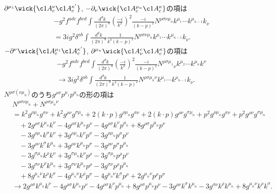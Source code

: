 $\partial^{\mu_1} \wick{\c1{A}^\nu_c \c1{A}_c^{\kappa'}}$, $-\partial_\nu \wick{\c1{A}^{\mu_n}_c \c1{A}_c^\kappa}$の項は
\begin{align*}
  & -g^2 f^{adc} f^{bcd}
  \int \frac{d^dk}{(2\pi)^d} \left( \frac{-i}{k^2} \right)^2 \frac{-i}{(k-p)^2}
  N^{\rho\sigma\nu\mu_n} k^{\mu_1} \cdots k^{\mu_{n-1}} k_\nu \\
  &= 3 ig^2 \delta^{ab} \int \frac{d^dk}{(2\pi)^d} \frac{1}{k^4(k-p)^2} N^{\rho\sigma\nu\mu_n} k^{\mu_1} \cdots k^{\mu_{n-1}} k_\nu .
\end{align*}
$-\partial^\nu \wick{\c1{A}^{\mu_1}_c \c1{A}_c^{\kappa'}}$, $\partial^{\mu_n} \wick{\c1{A}_\nu^c \c1{A}_c^\kappa}$の項は
\begin{align*}
  & -g^2 f^{adc} f^{bcd}
  \int \frac{d^dk}{(2\pi)^d} \left( \frac{-i}{k^2} \right)^2 \frac{-i}{(k-p)^2}
  N^{\rho\sigma\mu_1}{}_\nu k^{\mu_2} \cdots k^{\mu_n} k^\nu \\
  &\to 3 ig^2 \delta^{ab} \int \frac{d^dk}{(2\pi)^d} \frac{1}{k^4(k-p)^2} N^{\rho\sigma\mu_n\nu} k^{\mu_1} \cdots k^{\mu_{n-1}} k_\nu .
\end{align*}
$N^{\rho\sigma(\nu\mu_n)}$のうち$g^{\rho\sigma}p^{\mu_1}p^{\mu_n}$の形の項は
\begin{align*}
  &N^{\rho\sigma\nu\mu_n} + N^{\rho\sigma\mu_n\nu} \\
  &= k^2 g^{\rho\mu_n} g^{\sigma\nu} + k^2 g^{\rho\nu} g^{\sigma\mu_n}
  + 2 (k\cdot p) g^{\rho\mu_n} g^{\sigma\nu} + 2 (k\cdot p) g^{\rho\nu} g^{\sigma\mu_n} + p^2 g^{\rho\mu_n} g^{\sigma\nu} + p^2 g^{\rho\nu} g^{\sigma\mu_n} \\
  &\quad + 2 g^{\rho\sigma} k^{\mu_n} k^{\nu} - 4 g^{\rho\sigma} k^{\mu_n} p^{\nu} - 4 g^{\rho\sigma} k^{\nu} p^{\mu_n} + 8 g^{\rho\sigma} p^{\mu_n} p^{\nu} \\
  &\quad - 3 g^{\rho\mu_n} k^{\sigma} k^{\nu} + 3 g^{\rho\mu_n} k^{\nu} p^{\sigma} - 3 g^{\rho\mu_n} p^{\sigma} p^{\nu} \\
  &\quad - 3 g^{\rho\nu} k^{\sigma} k^{\mu_n} + 3 g^{\rho\nu} k^{\mu_n} p^{\sigma} - 3 g^{\rho\nu} p^{\sigma} p^{\mu_n} \\
  &\quad - 3 g^{\sigma\mu_n} k^{\rho} k^{\nu} + 3 g^{\sigma\mu_n} k^{\nu} p^{\rho} - 3 g^{\sigma\mu_n} p^{\rho} p^{\nu} \\
  &\quad - 3 g^{\sigma\nu} k^{\rho} k^{\mu_n} + 3 g^{\sigma\nu} k^{\mu_n} p^{\rho} - 3 g^{\sigma\nu} p^{\rho} p^{\mu_n} \\
  &\quad + 8 g^{\mu_n\nu} k^{\rho} k^{\sigma} - 4 g^{\mu_n\nu} k^{\rho} p^{\sigma} - 4 g^{\mu_n\nu} k^{\sigma} p^{\rho} + 2 g^{\mu_n\nu} p^{\rho} p^{\sigma} \\
  &\to 2 g^{\rho\sigma} k^{\mu_n} k^{\nu} - 4 g^{\rho\sigma} k^{\mu_n} p^{\nu} - 4 g^{\rho\sigma} k^{\nu} p^{\mu_n} + 8 g^{\rho\sigma} p^{\mu_n} p^{\nu}
  - 3 g^{\rho\nu} k^{\sigma} k^{\mu_n} - 3 g^{\sigma\nu} k^{\rho} k^{\mu_n}
  + 8 g^{\mu_n\nu} k^{\rho} k^{\sigma} .
\end{align*}
